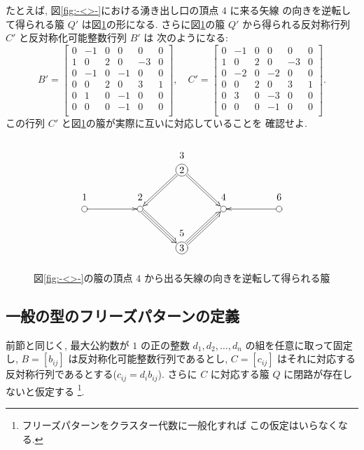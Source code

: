\documentclass[12pt,twoside,dvipdfm]{jarticle}
\theoremstyle{definition} %
\theoremstyle{definition} %
\theoremstyle{definition} %
\numberwithin{theorem}{section}
\numberwithin{equation}{section}
\numberwithin{figure}{section}
\numberwithin{table}{section}
\newcommand\figureref[1]{図\ref{#1}}
\newcommand\figref[1]{\figureref{#1}}
\begin{document}
たとえば, \figref{fig:-<>-}における湧き出し口の頂点 $4$ に来る矢線
の向きを逆転して得られる箙 $Q'$ は\figref{fig:-<>-'}の形になる.
さらに\figref{fig:-<>-'}の箙 $Q'$ から得られる反対称行列 $C'$ 
と反対称化可能整数行列 $B'$ は
次のようになる:
\begin{equation}
 B' = 
 \begin{bmatrix}
   0 &-1 & 0 & 0 & 0 & 0 \\
   1 & 0 & 2 & 0 &-3 & 0 \\
   0 &-1 & 0 &-1 & 0 & 0 \\
   0 & 0 & 2 & 0 & 3 & 1 \\
   0 & 1 & 0 &-1 & 0 & 0 \\
   0 & 0 & 0 &-1 & 0 & 0 \\
 \end{bmatrix},
 \quad
 C' = 
 \begin{bmatrix}
   0 &-1 & 0 & 0 & 0 & 0 \\
   1 & 0 & 2 & 0 &-3 & 0 \\
   0 &-2 & 0 &-2 & 0 & 0 \\
   0 & 0 & 2 & 0 & 3 & 1 \\
   0 & 3 & 0 &-3 & 0 & 0 \\
   0 & 0 & 0 &-1 & 0 & 0 \\
 \end{bmatrix}.
\end{equation}
この行列 $C'$ と\figref{fig:-<>-'}の箙が実際に互いに対応していることを
確認せよ.

\begin{figure}[hbtp!]
\[
\begin{xy}
 ( 0,20) *+[Fo]{} ="1"*+++!D{1},
 (20,20) *+[Fo]{} ="2"*+++!D{2},
 (35, 6) *+[Fo]{3}="5"*++++!D{5},
 (35,34) *+[Fo]{2}="3"*++++!D{3},
 (50,20) *+[Fo]{} ="4"*+++!D{4},
 (70,20) *+[Fo]{} ="6"*+++!D{6},
 \ar@{->}"1";"2",
 \ar@2{->}"3";"2",
 \ar@3{->}"2";"5",
 \ar@2{->}"3";"4",
 \ar@3{->}"5";"4",
 \ar@{->}"6";"4"
\end{xy}
\]
\caption{\figref{fig:-<>-}の箙の頂点 $4$ から出る矢線の向きを逆転して得られる箙}
\label{fig:-<>-'}
\end{figure}


\subsection{一般の型のフリーズパターンの定義}
\label{sec:general-FP}

前節と同じく, 
最大公約数が $1$ の正の整数 $d_1,d_2,\ldots,d_n$ の組を任意に取って固定し, 
$B=[b_{ij}]$ は反対称化可能整数行列であるとし, 
$C=[c_{ij}]$ はそれに対応する反対称行列であるとする($c_{ij}=d_i b_{ij}$).
さらに $C$ に対応する箙 $Q$ に閉路が存在しないと仮定する%
\footnote{フリーズパターンをクラスター代数に一般化すれば
この仮定はいらなくなる.}.
\end{document}
